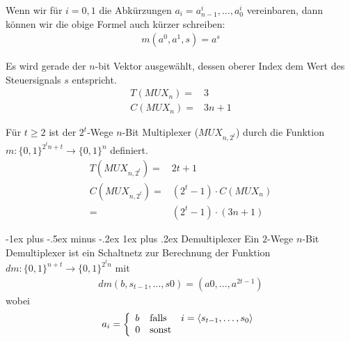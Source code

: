 \documentclass[9pt,a4paper]{scrartcl}
\makeatletter
\renewcommand{\subsubsection}{\@startsection{subsubsection}{3}{0mm}%
                                {-1ex plus -.5ex minus -.2ex}%
                                {1ex plus .2ex}%
                                {\normalfont\small\bfseries}}
\makeatother
\begin{document}
\begin{multicols}{2}
Wenn wir für $i = 0,1$ die Abkürzungen $a_i = a_{n-1}^i,\ldots,a_0^i$ vereinbaren, dann können wir die obige Formel auch kürzer schreiben:
\begin{eqnarray}
\nonumber
m(a^0, a^1, s) = a^s
\end{eqnarray}

Es wird gerade der $n$-bit Vektor ausgewählt, dessen oberer Index dem Wert des
Steuersignals $s$ entspricht.
\begin{eqnarray}
\nonumber
T(MUX_n) = &3\\
\nonumber
C(MUX_n) = &3n + 1
\end{eqnarray}

Für $t \geq 2$ ist der $2^t$-Wege $n$-Bit Multiplexer ($MUX_{n,2^t}$) durch die Funktion $m : \{0, 1\}^{2^tn+t}\rightarrow\{0, 1\}^n$ definiert.
\begin{eqnarray}
\nonumber
T(MUX_{n,2^t}) = &2t+1\\
\nonumber
C(MUX_{n,2^t}) = & (2^t-1) \cdot C(MUX_n) \\
\nonumber
= & (2^t-1)\cdot (3n+1)
\end{eqnarray}

\subsubsection{Demultiplexer}
Ein $2$-Wege $n$-Bit Demultiplexer ist ein Schaltnetz zur Berechnung der Funktion $dm : \{0, 1\}^{n+t}  \rightarrow \{0, 1\}^{2^t n}$ mit
\begin{eqnarray}
\nonumber
dm(b, s_{t-1},\ldots , s0) = (a0,\ldots , a^{2t-1})
\end{eqnarray}
wobei
\begin{eqnarray}
\nonumber
a_i = \left\{
	\begin{array}{l l l}
		b & \textnormal{falls} & i=\langle s_{t-1}, \ldots, s_0 \rangle\\
		0 & \textnormal{sonst} & \\
	\end{array}
\right.
\end{eqnarray}


\end{multicols}
\end{document}
